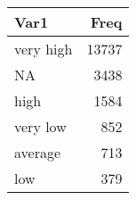 \begin{table}[H]
\centering
\begin{tabular}[t]{lr}
\toprule
Var1 & Freq\\
\midrule
very high & 13737\\
NA & 3438\\
high & 1584\\
very low & 852\\
average & 713\\
\addlinespace
low & 379\\
\bottomrule
\end{tabular}
\end{table}